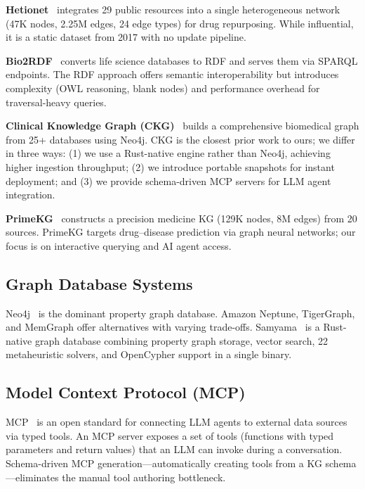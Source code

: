 \documentclass[11pt]{article}
\begin{document}
\textbf{Hetionet}~\citep{himmelstein2017systematic} integrates 29 public resources into a single heterogeneous network (47K nodes, 2.25M edges, 24 edge types) for drug repurposing. While influential, it is a static dataset from 2017 with no update pipeline.

\textbf{Bio2RDF}~\citep{belleau2008bio2rdf} converts life science databases to RDF and serves them via SPARQL endpoints. The RDF approach offers semantic interoperability but introduces complexity (OWL reasoning, blank nodes) and performance overhead for traversal-heavy queries.

\textbf{Clinical Knowledge Graph (CKG)}~\citep{santos2022clinical} builds a comprehensive biomedical graph from 25+ databases using Neo4j. CKG is the closest prior work to ours; we differ in three ways: (1) we use a Rust-native engine rather than Neo4j, achieving higher ingestion throughput; (2) we introduce portable snapshots for instant deployment; and (3) we provide schema-driven MCP servers for LLM agent integration.

\textbf{PrimeKG}~\citep{chandak2023building} constructs a precision medicine KG (129K nodes, 8M edges) from 20 sources. PrimeKG targets drug--disease prediction via graph neural networks; our focus is on interactive querying and AI agent access.

\subsection{Graph Database Systems}

Neo4j~\citep{neo4j2024} is the dominant property graph database. Amazon Neptune, TigerGraph, and MemGraph offer alternatives with varying trade-offs. Samyama~\citep{mandarapu2026samyama} is a Rust-native graph database combining property graph storage, vector search, 22 metaheuristic solvers, and OpenCypher support in a single binary.

\subsection{Model Context Protocol (MCP)}

MCP~\citep{anthropic2024mcp} is an open standard for connecting LLM agents to external data sources via typed tools. An MCP server exposes a set of tools (functions with typed parameters and return values) that an LLM can invoke during a conversation. Schema-driven MCP generation---automatically creating tools from a KG schema---eliminates the manual tool authoring bottleneck.
\end{document}
